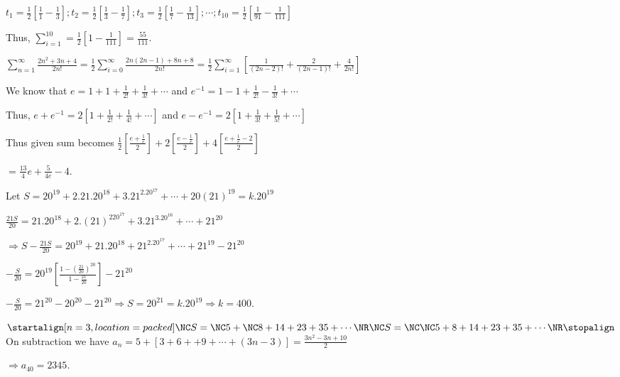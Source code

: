   $t_1 = \frac{1}{2}\left[\frac{1}{1} - \frac{1}{3}\right]; t_2 = \frac{1}{2}\left[\frac{1}{3}
    - \frac{1}{7}\right]; t_3 = \frac{1}{2}\left[\frac{1}{7} - \frac{1}{13}\right]; \cdots; t_{10}
  = \frac{1}{2}\left[\frac{1}{91} - \frac{1}{111}\right]$

  Thus, $\displaystyle\sum_{i = 1}^{10} = \frac{1}{2}\left[1 - \frac{1}{111}\right] = \frac{55}{111}$.
\item $\displaystyle\sum_{n = 1}^\infty\frac{2n^2 + 3n + 4}{2n!} = \frac{1}{2}\sum_{i = 0}^\infty\frac{2n(2n
  - 1) + 8n + 8}{2n!} = \frac{1}{2}\sum_{i = 1}^\infty\left[\frac{1}{(2n - 2)!} + \frac{2}{(2n - 1)!}
  + \frac{4}{2n!}\right]$

  We know that $e = 1 + 1 + \frac{1}{2!} + \frac{1}{3!} + \cdots$ and $e^{-1} = 1 - 1 + \frac{1}{2!}
  - \frac{1}{3!} + \cdots$

  Thus, $e + e^{-1} = 2\left[1 + \frac{1}{2!} + \frac{1}{4!} + \cdots\right]$ and $e - e^{-1} = 2\left[1
    + \frac{1}{3!} + \frac{1}{5!} + \cdots\right]$

  Thus given sum becomes $\displaystyle\frac{1}{2}\left[\frac{e + \frac{1}{e}}{2}\right] + 2\left[\frac{e
      - \frac{1}{e}}{2}\right] + 4\left[\frac{e + \frac{1}{e} - 2}{2}\right]$

  $= \frac{13}{4}e + \frac{5}{4e} - 4$.
\item Let $S = 20^{19} + 2.21.20^{18} + 3.21^2.20^{17} + \cdots + 20(21)^{19} = k.20^{19}$

  $\frac{21S}{20} = 21.20^{18} + 2.(21)^220^{17} + 3.21^3.20^{16} + \cdots + 21^{20}$

  $\Rightarrow S - \frac{21S}{20} = 20^{19} + 21.20^{18} + 21^2.20^{17} + \cdots + 21^{19} - 21^{20}$

  $-\frac{S}{20} = 20^{19}\displaystyle\left[\frac{1 - \left(\frac{21}{20}\right)^{20}}{1
    - \frac{21}{20}}\right] - 21^{20}$

  $-\frac{S}{20} = 21^{20} - 20^{20} - 21^{20}\Rightarrow S = 20^{21} = k.20^{19}\Rightarrow k = 400$.
\item \startframed[align=normal,frame=off,location=high]
  $\startalign[n=3, location=packed]
  \NC S = \NC 5 + \NC 8 + 14 + 23 + 35 + \cdots\NR
  \NC S = \NC \NC 5 + 8 + 14 + 23 + 35 + \cdots\NR
\stopalign$\stopframed
\\

  On subtraction we have $a_n = 5 + [3 + 6 +  + 9 + \cdots + (3n - 3)] = \frac{3n^2 - 3n + 10}{2}$

  $\Rightarrow a_{40} = 2345$.

